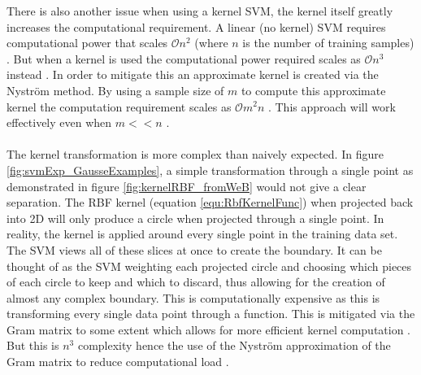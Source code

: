 There is also another issue when using a kernel SVM, the kernel itself greatly increases the computational requirement. A linear (no kernel) SVM requires computational power that scales $\mathcal{O}n^2$ (where $n$ is the number of training samples) \cite{cortes1995support}. But when a kernel is used the computational power required scales as $\mathcal{O}n^3$ instead \cite{williams2001using}. In order to mitigate this an approximate kernel is created via the Nyström method. By using a sample size of $m$ to compute this approximate kernel the computation requirement scales as $\mathcal{O}m^2n$ \cite{williams2001using}. This approach will work effectively even when $m << n$ \cite{williams2001using}. 
\\\\The kernel transformation is more complex than naively expected. In figure \ref{fig:svmExp_GausseExamples}, a simple transformation through a single point as demonstrated in figure \ref{fig:kernelRBF_fromWeB} would not give a clear separation. The RBF kernel (equation \ref{equ:RbfKernelFunc}) when projected back into 2D will only produce a circle when projected through a single point. In reality, the kernel is applied around every single point in the training data set. The SVM views all of these slices at once to create the boundary. It can be thought of as the SVM weighting each projected circle and choosing which pieces of each circle to keep and which to discard, thus allowing for the creation of almost any complex boundary. This is computationally expensive as this is transforming every single data point through a function. This is mitigated via the Gram matrix to some extent which allows for more efficient kernel computation \cite{williams2001using}. But this is $n^3$ complexity hence the use of the Nyström approximation of the Gram matrix to reduce computational load \cite{williams2001using}. 
